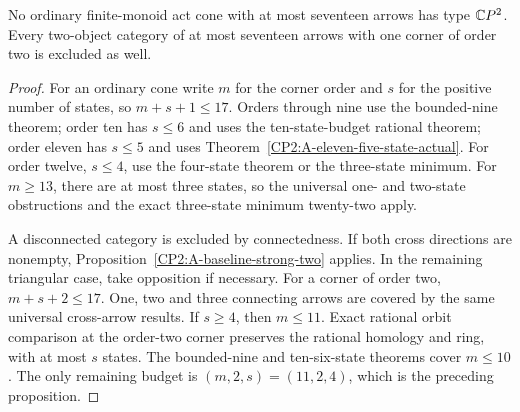 \begin{corollary}
\label{CP2:A-act-cones-through-seventeen}
No ordinary finite-monoid act cone with at most seventeen
arrows has type $\mathbb{C}P^2$.
Every two-object category of at most seventeen arrows with one
corner of order two is excluded as well.
\end{corollary}
\begin{proof}
For an ordinary cone write $m$ for the corner order and $s$
for the positive number of states, so $m+s+1\le17$.
Orders through nine use the bounded-nine theorem; order ten
has $s\le6$ and uses the ten-state-budget rational theorem;
order eleven has $s\le5$ and uses
Theorem~\ref{CP2:A-eleven-five-state-actual}. For order twelve,
$s\le4$, use the four-state theorem or the three-state minimum.
For $m\ge13$, there are at most three states, so the universal
one- and two-state obstructions and the exact three-state
minimum twenty-two apply.

A disconnected category is excluded by connectedness. If both cross directions are nonempty, Proposition~\ref{CP2:A-baseline-strong-two} applies. In the remaining triangular case, take opposition if necessary. For a corner of order two, $m+s+2\le17$. One, two and three
connecting arrows are covered by the same universal cross-arrow
results. If $s\ge4$, then $m\le11$. Exact rational orbit
comparison at the order-two corner preserves the rational
homology and ring, with at most $s$ states. The bounded-nine
and ten-six-state theorems cover $m\le10$. The only remaining
budget is $(m,2,s)=(11,2,4)$, which is the preceding proposition.
\end{proof}
